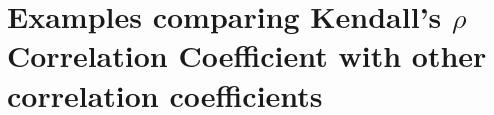 \section{Examples comparing Kendall's $\rho$ Correlation Coefficient with other correlation coefficients}
